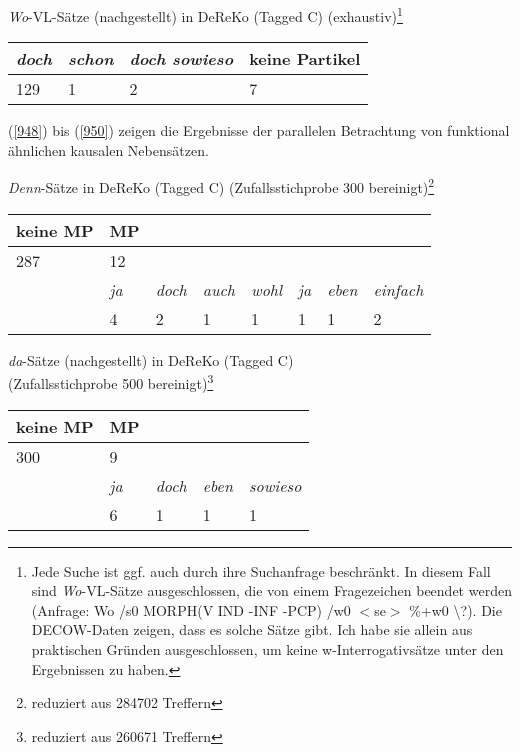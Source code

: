 {\begin{exe}
	\ex\label{947} \textit{Wo}-VL-Sätze (nachgestellt) in DeReKo (Tagged C) (exhaustiv)\footnote{Jede Suche ist ggf. auch durch ihre Suchanfrage beschränkt. In diesem Fall sind \textit{Wo}-VL-Sätze ausgeschlossen, die von einem Fragezeichen beendet werden (Anfrage: Wo /s0 MORPH(V IND -INF -PCP) /w0 $<$se$>$ \%$+$w0 \textbackslash?). Die DECOW-Daten zeigen, dass es solche Sätze gibt. Ich habe sie allein aus praktischen Gründen ausgeschlossen, um keine w-Interrogativsätze unter den Ergebnissen zu haben.}\\[-1em]
    \begin{tabular}[t]{|l|l|l|l|}
    \hline
    \textit{doch} & \textit{schon} & \textit{doch sowieso} & keine Partikel\\
    \hline
    129 & 1 & 2 & 7\\
    \hline	 
    \end{tabular}   
\end{exe}
(\ref{948}) bis (\ref{950}) zeigen die Ergebnisse der parallelen Betrachtung von funktional ähnlichen kausalen Nebensätzen.

\begin{exe}
	\ex\label{948} \textit{Denn}-Sätze in DeReKo (Tagged C) (Zufallsstichprobe 300 bereinigt)\footnote{reduziert aus 284702 Treffern}\\[-1em]
    \begin{tabular}[t]{|l|l|l|l|l|l|l|l|}
    \hline
    keine MP & MP & & & & & &  \\
    \hline
    287 & 12 & & & & & & \\
    \hline
    & \textit{ja} & \textit{doch} & \textit{auch} & \textit{wohl} & \textit{ja} & \textit{eben} & \textit{einfach}\\
    \hline
    & 4 & 2 & 1 & 1 & 1 & 1 & 2\\
    \hline	 
    \end{tabular}   
\end{exe}

\begin{exe}
	\ex\label{949} \textit{da}-Sätze (nachgestellt) in DeReKo (Tagged C)\\
	(Zufallsstichprobe 500 bereinigt)\footnote{reduziert aus 260671 Treffern}\\[-1em]
    \begin{tabular}[t]{|l|l|l|l|l|}
    \hline
    keine MP & MP & & & \\
    \hline
    300 & 9 & & & \\
    \hline
    & \textit{ja} & \textit{doch} & \textit{eben} & \textit{sowieso}\\
    \hline
    & 6 & 1 & 1 & 1\\
    \hline	 
    \end{tabular}   
\end{exe}

}
